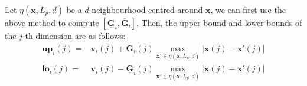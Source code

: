 Let $\eta(\textbf{x},L_p,d)$ be a $d$-neighbourhood centred around $\textbf{x}$, we can first use the above method to compute $[\underline{\textbf{G}}_i, \overline{\textbf{G}}_i]$. 
Then,  the upper bound and lower bounds of the $j$-th dimension are as follows: 
\begin{equation}
\begin{array}{cc}
    \textbf{up}_i(j) = & \textbf{v}_i(j) +  \overline{\textbf{G}}_i(j)  \max_{\textbf{x}'\in \eta(\textbf{x},L_p,d)} |\textbf{x}(j) - \textbf{x}'(j)|  \\
    \textbf{lo}_i(j) = & \textbf{v}_i(j) - \underline{ \textbf{G}}_i(j)  \max_{\textbf{x}'\in \eta(\textbf{x},L_p,d)} |\textbf{x}(j) - \textbf{x}'(j)|\\
\end{array}
\end{equation}

